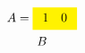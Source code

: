 \documentclass{article}
\begin{document}
\[ \begin{gathered}
A=\colorbox{yellow}{$\begin{array}{cc}1 &0\end{array}$}\\ B
\end{gathered} \]
\end{document}
